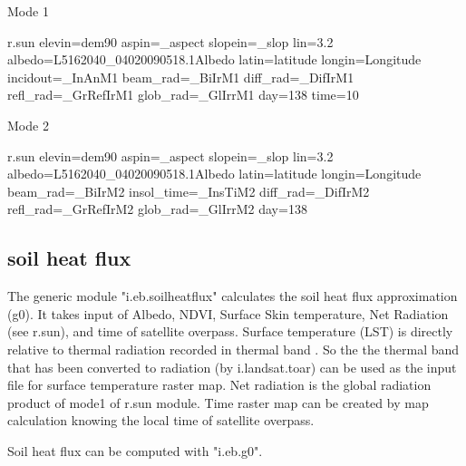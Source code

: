 Mode 1
\begin{smallverbatim}
 r.sun elevin=dem90
  aspin=_aspect slopein=_slop lin=3.2
  albedo=L5162040_04020090518.1Albedo
  latin=latitude longin=Longitude
  incidout=_InAnM1 beam_rad=_BiIrM1
  diff_rad=_DifIrM1 refl_rad=_GrRefIrM1
  glob_rad=_GlIrrM1 day=138 time=10
\end{smallverbatim}

Mode 2
\begin{smallverbatim}
 r.sun elevin=dem90
  aspin=_aspect slopein=_slop lin=3.2
  albedo=L5162040_04020090518.1Albedo
  latin=latitude longin=Longitude
  beam_rad=_BiIrM2 insol_time=_InsTiM2
  diff_rad=_DifIrM2 refl_rad=_GrRefIrM2
  glob_rad=_GlIrrM2 day=138
\end{smallverbatim}


\subsection{soil heat flux}
The generic module "i.eb.soilheatflux" calculates the soil heat flux approximation (g0). It takes input of Albedo, NDVI, Surface Skin temperature, Net Radiation (see r.sun), and time of satellite overpass.\newline
Surface temperature (LST) is directly relative to thermal radiation recorded in thermal band . So the the thermal band that has been converted to radiation (by i.landsat.toar) can be used as the input file for surface temperature raster map.\newline 
Net radiation is the global radiation product of mode1 of r.sun module.\newline
Time raster map can be created by map calculation knowing the local time of satellite overpass.\newline

Soil heat flux can be computed with "i.eb.g0".\newline

